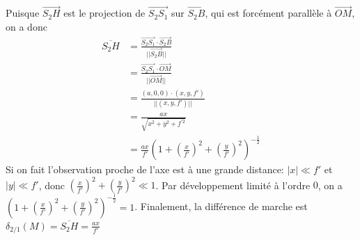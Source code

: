 \documentclass[a4paper,12pt]{book}
\begin{document}
Puisque $\stackrel{\longrightarrow}{S_2H}$ est le projection de $\stackrel{\longrightarrow}{S_2S_1}$ sur $\stackrel{\longrightarrow}{S_2B}$, qui est forcément parallèle à $\stackrel{\longrightarrow}{OM}$, on a donc 
\begin{align*}
    \overline{S_2H}&=\frac{\stackrel{\longrightarrow}{S_2S_1}\cdot\stackrel{\longrightarrow}{S_2B}}{||\stackrel{\longrightarrow}{S_2B}||}\\
    &=\frac{\stackrel{\longrightarrow}{S_2S_1}\cdot\stackrel{\longrightarrow}{OM}}{||\stackrel{\longrightarrow}{OM}||}\\
    &=\frac{(a,0,0)\cdot (x,y,f')}{||(x,y,f')||}\\
    &=\frac{ax}{\sqrt{x^2+y^2+f^{'2}}}\\
    &=\frac{ax}{f'}\left(1+\left(\frac{x}{f'}\right)^2+\left(\frac{y}{f'}\right)^2\right)^{-\frac{1}{2}}
\end{align*}
Si on fait l'observation proche de l'axe est à une grande distance: 
$|x|\ll f'$ et $|y| \ll f'$, donc $\left(\frac{x}{f'}\right)^2+\left(\frac{y}{f'}\right)^2 \ll 1$. 
Par développement limité à l'ordre $0$, on a 
$\left(1+\left(\frac{x}{f'}\right)^2+\left(\frac{y}{f'}\right)^2\right)^{-\frac{1}{2}}=1$. 
Finalement, la différence de marche est $\boxed{\delta_{2/1}(M)=\overline{S_2H}=\frac{ax}{f'}}$
\end{document}
